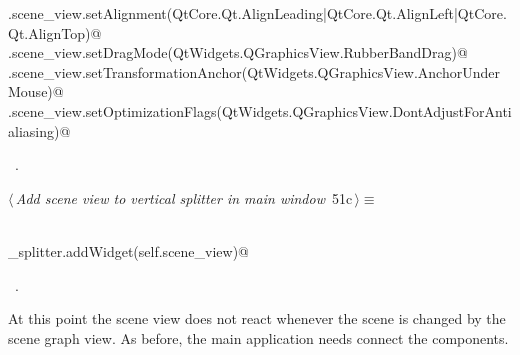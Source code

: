 \documentclass[
    a4paper,      %
    10pt,         %
    openright,    %
    notitlepage,  %
    parskip=half, %
]{scrreprt}       %
\theoremstyle{definition}                    %
\begin{document}
\begin{flushleft}
\begin{minipage}{\linewidth}
\begin{list}{}{}
\mbox{}\lstinline@self.scene_view.setAlignment(QtCore.Qt.AlignLeading|QtCore.Qt.AlignLeft|QtCore.Qt.AlignTop)@\\
\mbox{}\lstinline@self.scene_view.setDragMode(QtWidgets.QGraphicsView.RubberBandDrag)@\\
\mbox{}\lstinline@self.scene_view.setTransformationAnchor(QtWidgets.QGraphicsView.AnchorUnderMouse)@\\
\mbox{}\lstinline@self.scene_view.setOptimizationFlags(QtWidgets.QGraphicsView.DontAdjustForAntialiasing)@\\
\mbox{}\lstinline@@{\NWsep}
\end{list}
\vspace{-1.5ex}
\footnotesize
\begin{list}{}{\setlength{\itemsep}{-\parsep}\setlength{\itemindent}{-\leftmargin}}
\item \NWtxtMacroRefIn\ .

\item{}
\end{list}
\end{minipage}\vspace{4ex}
\end{flushleft}
\begin{flushleft} \small
\begin{minipage}{\linewidth}\label{scrap75}\raggedright\small
{} $\langle\,${\itshape Add scene view to vertical splitter in main window}\nobreak\ {\footnotesize {51c}}$\,\rangle\equiv$
\vspace{-1exm}
\begin{list}{}{} \item
\mbox{}\lstinline@@\\
\mbox{}\lstinline@vertical_splitter.addWidget(self.scene_view)@\\
\mbox{}\lstinline@@{\NWsep}
\end{list}
\vspace{-1.5ex}
\footnotesize
\begin{list}{}{\setlength{\itemsep}{-\parsep}\setlength{\itemindent}{-\leftmargin}}
\item \NWtxtMacroRefIn\ .

\item{}
\end{list}
\end{minipage}\vspace{4ex}
\end{flushleft}
At this point the scene view does not react whenever the scene is changed by the
scene graph view. As before, the main application needs connect the components.
\end{document}
